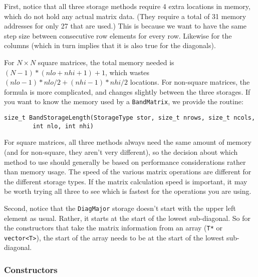 \documentclass[twoside,letterpaper,11pt]{article}
\renewcommand{\tt}[1]{{\texttt {#1}}}
\begin{document}
First, notice that all three storage methods require 4 extra locations in memory, 
which do not hold
any actual matrix data.  
(They require a total of 31 memory addresses for only 27 that are used.)
This is because we want to have the same step size between consecutive row elements
for every row.  Likewise for the columns (which in turn implies that it is also 
true for the diagonals).

For $N\times N$ square matrices, the total memory needed is $(N-1)*(nlo+nhi+1)+1$, 
which wastes $(nlo-1)*nlo/2 + (nhi-1)*nhi/2$ locations.  For non-square
matrices, the formula is more complicated, and changes slightly between the 
three storages.
If you want to know the memory used by a \tt{BandMatrix}, we provide the routine:
\begin{verbatim}
size_t BandStorageLength(StorageType stor, size_t nrows, size_t ncols, 
        int nlo, int nhi)
\end{verbatim}
  
For square matrices, all three methods always need the same amount of memory 
(and for non-square, they aren't very different), so the 
decision about which method to use should generally be based on performance 
considerations rather than memory usage.
The speed of the various matrix operations are different for the different storage 
types.  If the matrix calculation speed is important, it may be worth trying 
all three to see which is fastest for the operations you are using.

Second, notice that the \tt{DiagMajor} storage doesn't start with the 
upper left element as usual.
Rather, it starts at the start of the lowest sub-diagonal.  
So for the constructors that 
take the matrix information from an array (\tt{T*} or \tt{vector<T>}), 
the start of the array needs to be at the start of the lowest sub-diagonal.  

\subsubsection{Constructors}
\end{document}
